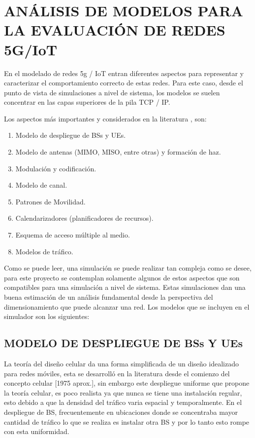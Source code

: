 
\section{ANÁLISIS DE MODELOS PARA LA EVALUACIÓN DE REDES 5G/IoT}
En el modelado de redes 5g / IoT entran diferentes aspectos para representar y caracterizar el comportamiento correcto de estas redes. Para este caso, desde el punto de vista de simulaciones a nivel de sistema, los modelos se suelen concentrar en las capas superiores de la pila TCP / IP.\newline

Los aspectos más importantes y considerados en la literatura \parencite{WirelessSim}, son:

\begin{enumerate}
    \item  Modelo de despliegue de BSs y UEs.
    \item  Modelo de antenas (MIMO, MISO, entre otras) y formación de haz.
    \item  Modulación y codificación.
    \item  Modelo de canal.
    \item  Patrones de Movilidad.
    \item  Calendarizadores (planificadores de recursos).
    \item  Esquema de acceso múltiple al medio.
    \item  Modelos de tráfico.
\end{enumerate}

Como se puede leer, una simulación se puede realizar tan compleja como se desee, para este proyecto se contemplan solamente algunos de estos aspectos que son compatibles para una simulación a nivel de sistema. Estas simulaciones dan una buena estimación de un análisis fundamental desde la perspectiva del dimensionamiento que puede alcanzar una red.\newline
Los modelos que se incluyen en el simulador son los siguientes:

\subsection{MODELO DE DESPLIEGUE DE BSs Y UEs}

La teoría del diseño celular da una forma simplificada de un diseño idealizado para redes móviles, esta se desarrolló en la literatura desde el comienzo del concepto celular [1975 aprox.], sin embargo este despliegue uniforme que propone la teoría celular, es poco realista ya que nunca se tiene una instalación regular, esto debido a que la densidad del tráfico varia espacial y temporalmente. En el despliegue de BS, frecuentemente en ubicaciones donde se concentraba mayor cantidad de tráfico lo que se realiza es instalar otra BS y por lo tanto esto rompe con esta uniformidad.\newline

